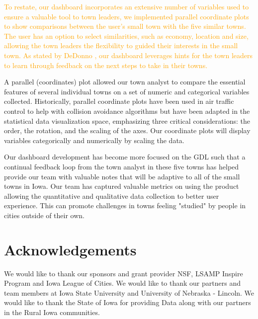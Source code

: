 \documentclass[10pt]{article}\usepackage[]{graphicx}\usepackage[]{color}
\newcommand{\db}[1]{{\textcolor{orange}{#1}}}
\begin{document}
\db{ To restate, our dashboard incorporates an extensive number of variables used to ensure a valuable tool to town leaders, we implemented parallel coordinate plots to show comparisons between the user's small town with the five similar towns. The user has an option to select similarities, such as economy, location and size, allowing the town leaders the flexibility to guided their interests in the small town. As stated by DeDonno \cite{dedonno}, our dashboard leverages hints for the town leaders to learn through feedback on the next steps to take in their towns. }

A parallel (coordinates) plot allowed our town analyst to compare the essential features of several individual towns on a set of numeric and categorical variables collected. Historically, parallel coordinate plots have been used in air traffic control to help with collision avoidance algorithms but have been adapted in the statistical data visualization space, emphasizing three critical considerations: the order, the rotation, and the scaling of the axes. Our coordinate plots will display variables categorically and numerically by scaling the data.


Our dashboard development has become more focused on the GDL such that a continual feedback loop from the town analyst in these five towns has helped provide our team with valuable notes that will be adaptive to all of the small towns in Iowa. Our team has captured valuable metrics on using the product allowing the quantitative and qualitative data collection to better user experience. This can promote challenges in towns feeling "studied" by people in cities outside of their own. 



\section{Acknowledgements}
We would like to thank our sponsors and grant provider NSF, LSAMP Inspire Program and Iowa League of Cities. We would like to thank our partners and team members at Iowa State University and University of Nebraska - Lincoln. We would like to thank the State of Iowa for providing Data along with our partners in the Rural Iowa communities.



\end{document}
